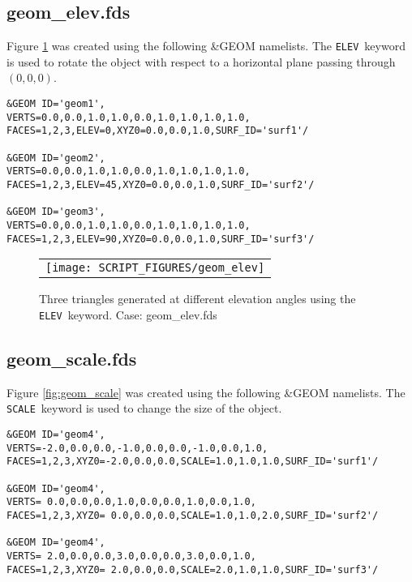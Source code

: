 \documentclass[12pt]{article}
\begin{document}
\subsection{geom\_elev.fds}
Figure \ref{fig:geom_elev} was created using the following \&GEOM namelists.
The {\tt ELEV}\ keyword is used to rotate the object with respect to a horizontal plane
passing through $(0,0,0)$.

{\scriptsize
\begin{verbatim}
&GEOM ID='geom1',
VERTS=0.0,0.0,1.0,1.0,0.0,1.0,1.0,1.0,1.0,
FACES=1,2,3,ELEV=0,XYZ0=0.0,0.0,1.0,SURF_ID='surf1'/

&GEOM ID='geom2',
VERTS=0.0,0.0,1.0,1.0,0.0,1.0,1.0,1.0,1.0,
FACES=1,2,3,ELEV=45,XYZ0=0.0,0.0,1.0,SURF_ID='surf2'/

&GEOM ID='geom3',
VERTS=0.0,0.0,1.0,1.0,0.0,1.0,1.0,1.0,1.0,
FACES=1,2,3,ELEV=90,XYZ0=0.0,0.0,1.0,SURF_ID='surf3'/
\end{verbatim}
}

\begin{figure}[\figoptions]
\begin{center}
\begin{tabular}{c}
 \texttt{[image: SCRIPT\_FIGURES/geom\_elev]}
  \end{tabular}
\end{center}
 \caption{Three triangles generated at different elevation angles using the {\tt ELEV}\ keyword. Case: geom\_elev.fds}
\label{fig:geom_elev}
\end{figure}

\subsection{geom\_scale.fds}
Figure \ref{fig:geom_scale} was created using the following \&GEOM namelists.
The {\tt SCALE}\ keyword is used to change the size of the object.

{\scriptsize
\begin{verbatim}
&GEOM ID='geom4',
VERTS=-2.0,0.0,0.0,-1.0,0.0,0.0,-1.0,0.0,1.0,
FACES=1,2,3,XYZ0=-2.0,0.0,0.0,SCALE=1.0,1.0,1.0,SURF_ID='surf1'/

&GEOM ID='geom4',
VERTS= 0.0,0.0,0.0,1.0,0.0,0.0,1.0,0.0,1.0,
FACES=1,2,3,XYZ0= 0.0,0.0,0.0,SCALE=1.0,1.0,2.0,SURF_ID='surf2'/

&GEOM ID='geom4',
VERTS= 2.0,0.0,0.0,3.0,0.0,0.0,3.0,0.0,1.0,
FACES=1,2,3,XYZ0= 2.0,0.0,0.0,SCALE=2.0,1.0,1.0,SURF_ID='surf3'/
\end{verbatim}
}
\end{document}
